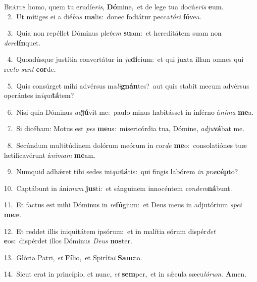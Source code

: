 \lettrine{\initial\textcolor{\initialcolor}{B}}{eátus} homo, quem tu erudíe\-\textit{ris}\-, \textbf{Dó}\-mine,~\star et de lege tua docú\-\textit{e}\-\textit{ris} \textbf{e}\-um.\\
{\numbfont\textcolor{\numbcolor}{~2.}}~Ut mítiges ei a dié\textit{bus} \textbf{ma}\-lis:~\star donec fodiátur pecca\-\textit{tó}\-\textit{ri} \textbf{fó}\-vea.\par
{\numbfont\textcolor{\numbcolor}{~3.}}~Quia non repéllet Dóminus ple\textit{bem} \textbf{su}\-am:~\star et hereditátem suam non \textit{de}\-\textit{re}\textbf{lín}quet.\par
{\numbfont\textcolor{\numbcolor}{~4.}}~Quoadúsque justítia convertátur in \textit{ju}\-\textbf{dí}cium:~\star et qui juxta illam omnes qui rec\textit{to} \textit{sunt} \textbf{cor}\-de.\par
{\numbfont\textcolor{\numbcolor}{~5.}}~Quis consúrget mihi advérsus ma\-\textit{li}\-\textbf{gnán}tes?~\star aut quis stabit mecum advérsus operántes in\-\textit{i}\-\textit{qui}\textbf{tá}tem?\par
{\numbfont\textcolor{\numbcolor}{~6.}}~Nisi quia Dóminus \textit{ad}\-\textbf{jú}vit me:~\star paulo minus habitásset in inférno á\-\textit{ni}\-\textit{ma} \textbf{me}\-a.\par
{\numbfont\textcolor{\numbcolor}{~7.}}~Si dicébam: Motus est \textit{pes} \textbf{me}\-us:~\star misericórdia tua, Dómine, \textit{ad}\-\textit{ju}\textbf{vá}bat me.\par
{\numbfont\textcolor{\numbcolor}{~8.}}~Secúndum multitúdinem dolórum meórum in cor\textit{de} \textbf{me}\-o:~\star consolatiónes tuæ lætificavérunt á\-\textit{ni}\-\textit{mam} \textbf{me}\-am.\par
{\numbfont\textcolor{\numbcolor}{~9.}}~Numquid adhǽret tibi sedes ini\-\textit{qui}\-\textbf{tá}tis:~\star qui fingis labórem \textit{in} \textit{præ}\-\textbf{cép}to?\par
{\numbfont\textcolor{\numbcolor}{10.}}~Captábunt in áni\textit{mam} \textbf{jus}\-ti:~\star et sánguinem innocéntem \textit{con}\-\textit{dem}\textbf{ná}bunt.\par
{\numbfont\textcolor{\numbcolor}{11.}}~Et factus est mihi Dóminus in \textit{re}\-\textbf{fú}gium:~\star et Deus meus in adjutórium \textit{spe}\-\textit{i} \textbf{me}\-æ.\par
{\numbfont\textcolor{\numbcolor}{12.}}~Et reddet illis iniquitátem ipsórum:~\dagger et in malítia eórum dispér\textit{det} \textbf{e}\-os:~\star dispérdet illos Dóminus \textit{De}\-\textit{us} \textbf{nos}\-ter.\par
{\numbfont\textcolor{\numbcolor}{13.}}~Glória Patri, \textit{et} \textbf{Fí}\-lio,~\star et Spirí\-\textit{tu}\-\textit{i} \textbf{Sanc}\-to.\par
{\numbfont\textcolor{\numbcolor}{14.}}~Sicut erat in princípio, et nunc, \textit{et} \textbf{sem}\-per,~\star et in sǽcula sæcu\-\textit{ló}\-\textit{rum}. \textbf{A}\-men.\par
